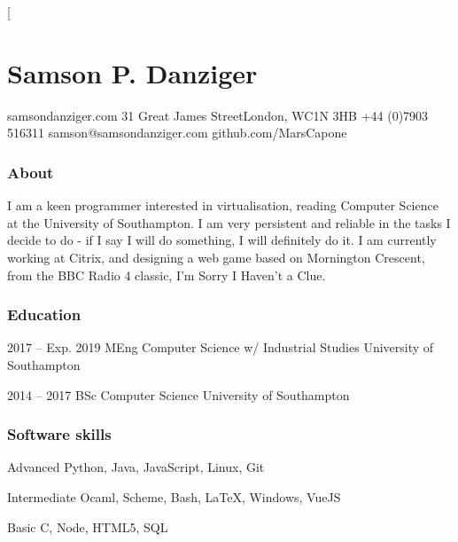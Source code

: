 \documentclass{tccv}
\begin{document}
\twocolumn[

\part{Samson P. Danziger}

\begin{multicols}{2}
    \personal
        {samsondanziger.com}
        {31 Great James Street\newline London, WC1N 3HB}
        {+44 (0)7903 516311}
        {samson@samsondanziger.com}
        {github.com/MarsCapone}

    \section{About}
        I am a keen programmer interested in virtualisation, reading Computer Science at the University of Southampton. I am very persistent and reliable in the tasks I decide to do - if I say I will do something, I will definitely do it. I am currently working at Citrix, and designing a web game based on Mornington Crescent, from the BBC Radio 4 classic, I'm Sorry I Haven't a Clue.

\end{multicols}

\hline
\bigskip

\begin{multicols}{2}
    \section{Education}

        \begin{yearlist}

        \item{2017 -- Exp. 2019}
             {MEng Computer Science \newline w/ Industrial Studies}
             {University of Southampton}

        {\item[Awarded 2:1]{2014 -- 2017}
             {BSc Computer Science}
             {University of Southampton}}

        \end{yearlist}

    \section{Software skills}

        \begin{factlist}

        \item{Advanced}
             {Python, Java, JavaScript, Linux, Git}

        \item{Intermediate}
             {Ocaml, Scheme, Bash, \LaTeX, Windows, VueJS}

        \item{Basic}
             {C, Node, HTML5, SQL}

        \end{factlist}

\end{multicols}
\end{document}
